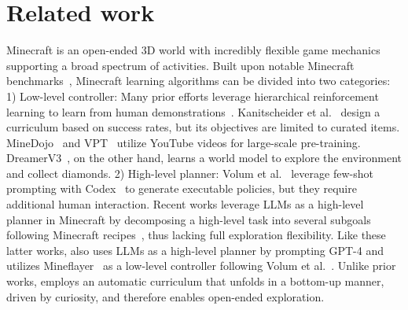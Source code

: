 \section{Related work}
\label{sec:related}
Minecraft is an open-ended 3D world with incredibly flexible game mechanics supporting a broad spectrum of activities. Built upon notable Minecraft benchmarks~\cite{fan2022minedojo,guss2019minerl,guss2019minerl2,guss2021minerl,kanervisto2022minerl,johnson16malmo}, Minecraft learning algorithms can be divided into two categories: 
1) Low-level controller: Many prior efforts leverage hierarchical reinforcement learning to learn from human demonstrations~\cite{lin2021juewumc,mao2021seihai,skrynnik2021hierarchical}. 
Kanitscheider et al.~\cite{kanitscheider2021multitask} design a curriculum based on success rates, but its objectives are limited to curated items.
MineDojo~\cite{fan2022minedojo} and VPT~\cite{openai2022vpt} utilize YouTube videos for large-scale pre-training. 
DreamerV3~\cite{hafner2023mastering}, on the other hand, learns a world model to explore the environment and collect diamonds.
2) High-level planner: Volum et al.~\cite{volum2022craft} leverage few-shot prompting with Codex~\cite{openai2021codex} to generate executable policies, but they require additional human interaction. Recent works leverage LLMs as a high-level planner in Minecraft by decomposing a high-level task into several subgoals following Minecraft recipes~\cite{wang2023describe,nottingham2023embodied,yuan2023plan4mc}, thus lacking full exploration flexibility.
Like these latter works, \voyager also uses LLMs as a high-level planner by prompting GPT-4 and utilizes Mineflayer~\cite{mineflayer} as a low-level controller following Volum et al.~\cite{volum2022craft}. Unlike prior works, \voyager employs an automatic curriculum that unfolds in a bottom-up manner, driven by curiosity, and therefore enables open-ended exploration.

